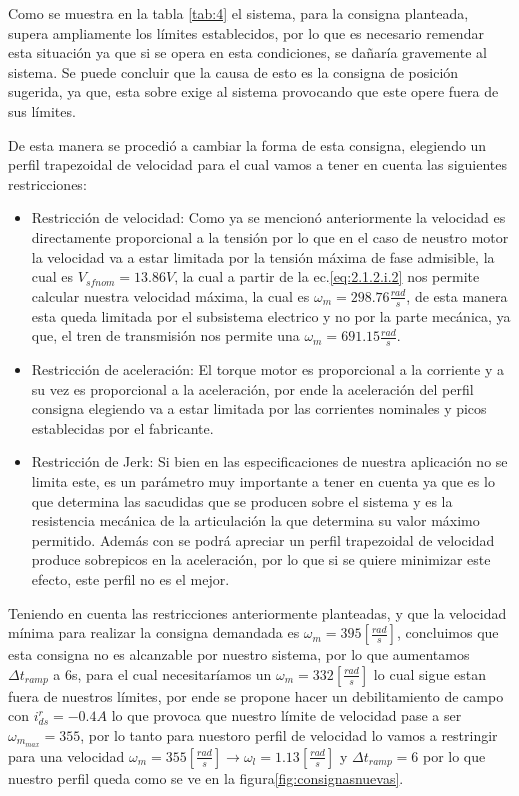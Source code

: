 \documentclass[10pt]{article}
\begin{document}
\begin{itemize}
Como se muestra en la tabla \ref{tab:4} el sistema, para la consigna planteada, supera ampliamente los límites establecidos,
 por lo que es necesario remendar esta situación ya que si se opera en esta condiciones, se dañaría gravemente al sistema.
 Se puede concluir que la causa de esto es la consigna de posición sugerida, ya que, esta sobre exige al sistema provocando que este opere fuera 
 de sus límites.

 De esta manera se procedió a cambiar la forma de esta consigna, elegiendo un perfil trapezoidal de velocidad para el cual vamos a tener en cuenta las siguientes restricciones:
 \begin{itemize}
	 \item Restricción de velocidad: Como ya se mencionó anteriormente la velocidad es directamente proporcional a la tensión por lo que en el caso de neustro motor la velocidad 
	 va a estar limitada por la tensión máxima de fase admisible, la cual es \textbf{$V_{sfnom}=13.86 V$}, la cual a partir de la ec.\ref{eq:2.1.2.i.2} nos permite calcular nuestra velocidad
	 máxima, la cual es $\omega_{m}=298.76\frac{rad}{s}$, de esta manera esta queda limitada por el subsistema electrico y no por la parte mecánica, ya que, el tren de transmisión nos 
	 permite una $\omega_{m}=691.15\frac{rad}{s}$.

	 \item Restricción de aceleración: El torque motor es proporcional a la corriente y a su vez es proporcional a la aceleración, por ende la aceleración del perfil consigna elegiendo
	 va a estar limitada por las corrientes nominales y picos establecidas por el fabricante.

	 \item Restricción de Jerk: Si bien en las especificaciones de nuestra aplicación no se limita este, es un parámetro muy importante a tener en cuenta ya que es lo que determina las sacudidas 
	 que se producen sobre el sistema y es la resistencia mecánica de la articulación la que determina su valor máximo permitido. Además con se podrá apreciar un perfil trapezoidal de velocidad
	 produce sobrepicos en la aceleración, por lo que si se quiere minimizar este efecto, este perfil no es el mejor.

 \end{itemize}

 Teniendo en cuenta las restricciones anteriormente planteadas, y que la velocidad mínima para realizar la consigna demandada es $\omega_{m}=395[\frac{rad}{s}]$, concluimos que esta consigna no es alcanzable
 por nuestro sistema, por lo que aumentamos $\Delta t_{ramp}$ a 6s, para el cual necesitaríamos un $\omega_{m}=332[\frac{rad}{s}]$ lo cual sigue estan fuera de nuestros límites, por ende se propone hacer un debilitamiento
 de campo con $i^{r}_{ds}=-0.4A$ lo que provoca que nuestro límite de velocidad pase a ser $\omega_{m_{max}}=355$, por lo tanto para nuestoro perfil de velocidad lo vamos a restringir para una velocidad $\omega_{m}=355[\frac{rad}{s}]\rightarrow \omega_{l}=1.13[\frac{rad}{s}]$ y 
 $\Delta t_{ramp}=6$ por lo que nuestro perfil queda como se ve en la figura\ref{fig:consignasnuevas}.
 

\end{itemize}
\end{document}
